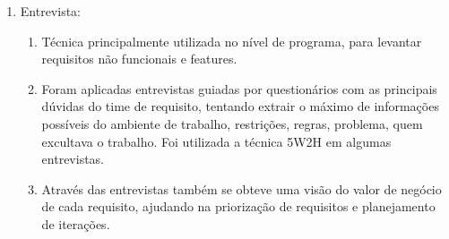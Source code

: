 \begin{enumerate}
	\item Entrevista:
		\begin{enumerate}
			\item Técnica principalmente utilizada no nível de programa, para levantar requisitos não funcionais e features. 
			
			\item Foram aplicadas entrevistas  guiadas por questionários  com as principais dúvidas do time de requisito, tentando extrair o máximo de informações possíveis do ambiente de trabalho, restrições, regras, problema, quem excultava o trabalho. Foi utilizada a técnica 5W2H em algumas entrevistas. %
			
			\item Através das entrevistas também se obteve uma visão do valor de negócio de cada requisito, ajudando na priorização de requisitos e planejamento de iterações.
		\end{enumerate}
\end{enumerate}